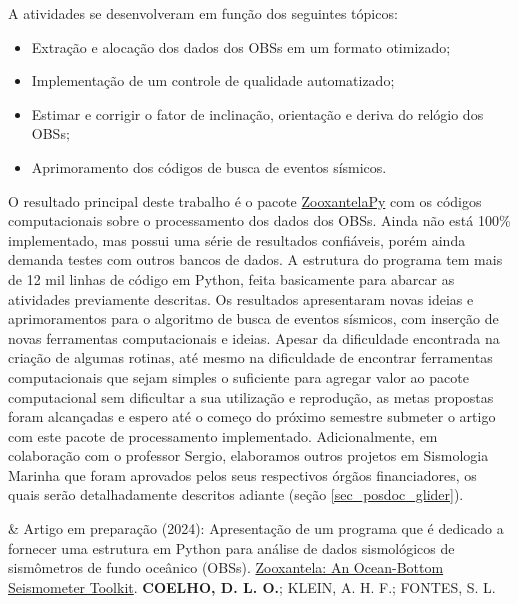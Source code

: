 \documentclass[10pt,a4paper,oneside]{book}
\begin{document}
A atividades se desenvolveram em função dos seguintes tópicos:
\begin{itemize}
	\item Extração e alocação dos dados dos OBSs em um formato otimizado;
	\item Implementação de um controle de qualidade automatizado;
	\item Estimar e corrigir o fator de inclinação, orientação e deriva do relógio dos OBSs;
	\item Aprimoramento dos códigos de busca de eventos sísmicos.
\end{itemize}

O resultado principal deste trabalho é o pacote \href{https://github.com/dIOGOLOC/ZooxantelaPy}{ZooxantelaPy} com os códigos computacionais sobre o processamento dos dados dos OBSs. Ainda não está 100\% implementado, mas possui uma série de resultados confiáveis, porém ainda demanda testes com outros bancos de dados. A estrutura do programa tem mais de 12 mil linhas de código em Python, feita basicamente para abarcar as atividades previamente descritas. Os resultados apresentaram novas ideias e aprimoramentos para o algoritmo de busca de eventos sísmicos, com inserção de novas ferramentas computacionais e ideias. Apesar da dificuldade encontrada na criação de algumas rotinas, até mesmo na dificuldade de encontrar ferramentas computacionais que sejam simples o suficiente para agregar valor ao pacote computacional sem dificultar a sua utilização e reprodução, as metas propostas foram alcançadas e espero até o começo do próximo semestre submeter o artigo com este pacote de processamento implementado. Adicionalmente, em colaboração com o professor Sergio, elaboramos outros projetos em Sismologia Marinha que foram aprovados pelos seus respectivos órgãos financiadores, os quais serão detalhadamente descritos adiante (seção \ref{sec_posdoc_glider}).

\bigskip

\begin{summarybox}[frametitle=\faBookmark{}\quad Resumo de atividades científicas]
	\begin{fa-ul}
\faBook & Artigo em preparação (2024): Apresentação de um programa que é dedicado a fornecer uma estrutura em Python para análise de dados sismológicos de sismômetros de fundo oceânico (OBSs). \href{https://zooxantelapy.readthedocs.io/}{Zooxantela: An Ocean-Bottom Seismometer Toolkit}. \textbf{COELHO, D. L. O.}; KLEIN, A. H. F.; FONTES, S. L.
	\end{fa-ul}
\end{summarybox}
\end{document}
